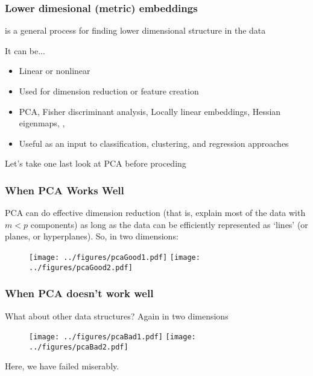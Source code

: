 \documentclass{beamer}
\begin{document}
\title{}
\subtitle{\classTitle}
\date{}



\begin{frame}
\maketitle
%
\organization
%
\end{frame}

\begin{frame}
  \frametitle{Lower dimesional (metric) embeddings}
   is a general process for finding lower
  dimensional structure in the data

  \vsp
It can be...
  \begin{itemize}
  \item Linear or nonlinear
  \item Used for dimension reduction or feature creation
  \item PCA, Fisher discriminant analysis, Locally
    linear embeddings, Hessian eigenmaps, , 
  \item Useful as an input to classification, clustering, and regression approaches
  \end{itemize}
  
  \vsp
  Let's take one last look at PCA before proceding
\end{frame}

\begin{frame}[fragile]
  \frametitle{When PCA Works Well}
PCA can do effective dimension reduction
(that is, explain most of the data with $m < p$ components) as long as the data can be efficiently represented as
  `lines' (or planes, or hyperplanes). 
  So, in two dimensions:
  \begin{figure}
    \centering
    \texttt{[image: ../figures/pcaGood1.pdf]}
    \texttt{[image: ../figures/pcaGood2.pdf]}    
  \end{figure}
\end{frame}

\begin{frame}
  \frametitle{When PCA doesn't work well}
  What about other data structures?  Again in two dimensions
  \begin{figure}
    \centering
    \texttt{[image: ../figures/pcaBad1.pdf]}
    \texttt{[image: ../figures/pcaBad2.pdf]}    
  \end{figure}
  Here, we have failed miserably.  
  \end{frame}
\end{document}
